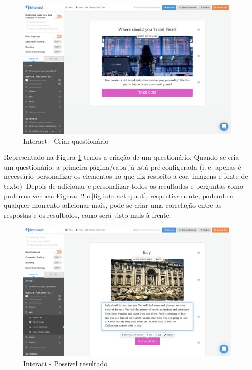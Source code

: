 \begin{figure}[ht!]
	\begin{center}
		\includegraphics[width=1\textwidth]{img/interact/create}
		\caption{Interact - Criar questionário}
		\label{fig:interact-create}
	\end{center}
\end{figure}

Representado na Figura \ref{fig:interact-create} temos a criação de um questionário. Quando se cria um questionário, a primeira página/capa já está pré-configurada (i. e. apenas é necessário personalizar os elementos no que diz respeito a cor, imagens e fonte de texto). Depois de adicionar e personalizar todos os resultados e perguntas como podemos ver nas Figuras \ref{fig:interact-result} e \ref{fig:interact-quest}, respectivamente, podendo a qualquer momento adicionar mais, pode-se criar uma correlação entre as respostas e os resultados, como será visto mais à frente.


\begin{figure}[ht!]
	\begin{center}
		\includegraphics[width=1\textwidth]{img/interact/result}
		\caption{Interact - Possível resultado}
		\label{fig:interact-result}
	\end{center}
\end{figure}


